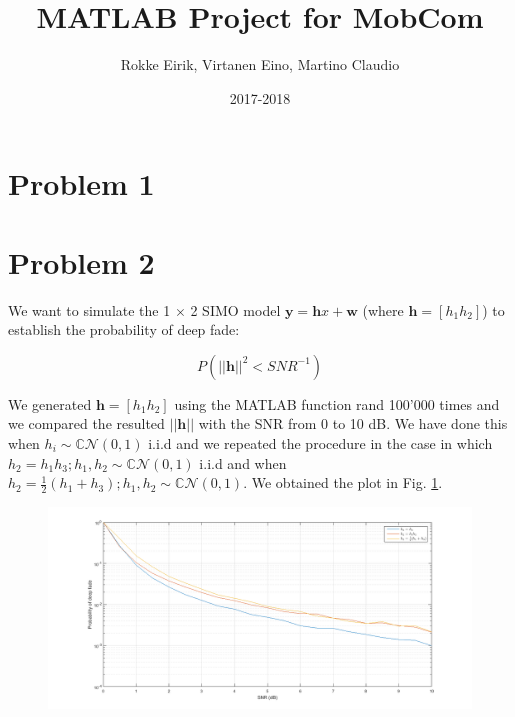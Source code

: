 \documentclass[11pt,a4paper]{article}
\begin{document}
\title{MATLAB Project for MobCom}
\date{2017-2018}
\author{Rokke Eirik, Virtanen Eino, Martino Claudio}

\maketitle

\section{Problem 1}

\section{Problem 2}
We want to simulate the 1 \(\times\) 2 SIMO model \(\textbf{y}=\textbf{h} x + \textbf{w}\) (where \(\textbf{h}=[h_1 h_2]\)) to establish the probability of deep fade:

\[ P(||\textbf{h}||^2 < SNR^{-1}) \]

We generated \(\textbf{h}=[h_1 h_2]\) using the MATLAB function rand 100'000 times and we compared the resulted \(||\textbf{h}||\) with the SNR from 0 to 10 dB. We have done this when \(h_i \sim  \mathbb{C} \mathcal{N}(0,1) \) i.i.d and we repeated the procedure in the case in which \(h_2=h_1 h_3; h_1,h_2 \sim  \mathbb{C} \mathcal{N}(0,1) \) i.i.d and when \(h_2=\frac{1}{2}(h_1 + h_3); h_1,h_2 \sim  \mathbb{C} \mathcal{N}(0,1) \). We obtained the plot in Fig. \ref{fig:deepfade01}.

\begin{figure}[h!]
\centering
\includegraphics[width=0.9\linewidth]{deepfade01}
\caption{}
\label{fig:deepfade01}
\end{figure}
\end{document}
